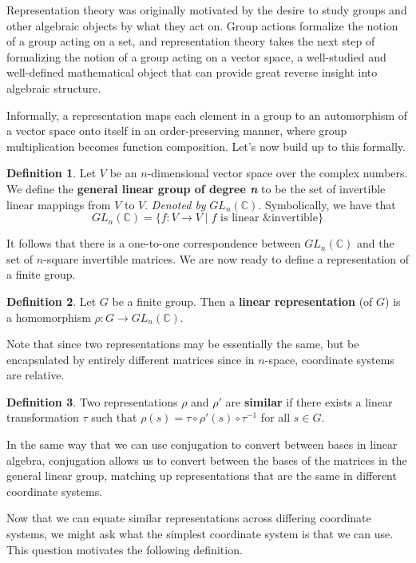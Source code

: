 \documentclass[openany, amssymb, psamsfonts]{amsart}
\theoremstyle{definition}
\newtheorem{defn}{Definition}[section]
\numberwithin{equation}{section}
\begin{document}
Representation theory was originally motivated by the desire to study groups and other algebraic objects by what they act on. Group actions formalize the notion of a group acting on a set, and representation theory takes the next step of formalizing the notion of a group acting on a vector space, a well-studied and well-defined mathematical object that can provide great reverse insight into algebraic structure.\par
Informally, a representation maps each element in a group to an automorphism of a vector space onto itself in an order-preserving manner, where group multiplication becomes function composition. Let's now build up to this formally.
\begin{defn}
    Let $V$ be an $n$-dimensional vector space over the complex numbers. We define the \textbf{general linear group of degree \emph{n}} to be the set of invertible linear mappings from $V$ to $V$. \emph{Denoted by} $GL_n(\mathbb{C})$. Symbolically, we have that
    \begin{equation*}
        GL_n(\mathbb{C}) = \{f:V\to V\mid f\text{ is linear \& invertible}\}
    \end{equation*}
\end{defn}
It follows that there is a one-to-one correspondence between $GL_n(\mathbb{C})$ and the set of $n$-square invertible matrices. We are now ready to define a representation of a finite group.
\begin{defn}
    Let $G$ be a finite group. Then a \textbf{linear representation} (of $G$) is a homomorphism $\rho:G\to GL_n(\mathbb{C})$.
\end{defn}
Note that since two representations may be essentially the same, but be encapsulated by entirely different matrices since in $n$-space, coordinate systems are relative.
\begin{defn}
    Two representations $\rho$ and $\rho'$ are \textbf{similar} if there exists a linear transformation $\tau$ such that $\rho(s)=\tau\circ\rho'(s)\circ\tau^{-1}$ for all $s\in G$.
\end{defn}
In the same way that we can use conjugation to convert between bases in linear algebra, conjugation allows us to convert between the bases of the matrices in the general linear group, matching up representations that are the same in different coordinate systems.\par
Now that we can equate similar representations across differing coordinate systems, we might ask what the simplest coordinate system is that we can use. This question motivates the following definition.
\end{document}
